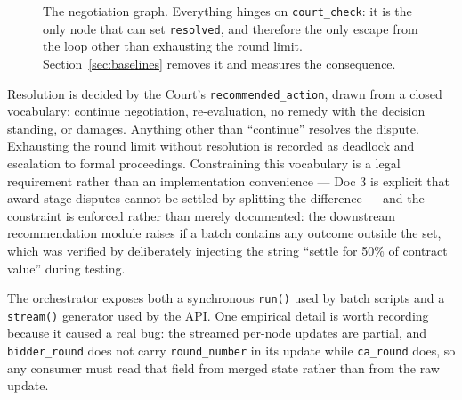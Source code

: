\begin{figure}[htbp]
\centering
{}
\caption[Negotiation state graph]{The negotiation graph. Everything hinges on
\texttt{court\_check}: it is the only node that can set \texttt{resolved}, and
therefore the only escape from the loop other than exhausting the round limit.
Section~\ref{sec:baselines} removes it and measures the consequence.}
\label{fig:graph}
\end{figure}

Resolution is decided by the Court's \texttt{recommended\_action}, drawn from a
closed vocabulary: continue negotiation, re-evaluation, no remedy with the
decision standing, or damages. Anything other than ``continue'' resolves the
dispute. Exhausting the round limit without resolution is recorded as deadlock and
escalation to formal proceedings. Constraining this vocabulary is a legal
requirement rather than an implementation convenience --- Doc 3 is explicit that
award-stage disputes cannot be settled by splitting the difference --- and the
constraint is enforced rather than merely documented: the downstream
recommendation module raises if a batch contains any outcome outside the set,
which was verified by deliberately injecting the string ``settle for 50\% of
contract value'' during testing.

The orchestrator exposes both a synchronous \texttt{run()} used by batch scripts
and a \texttt{stream()} generator used by the API. One empirical detail is worth
recording because it caused a real bug: the streamed per-node updates are partial,
and \texttt{bidder\_round} does not carry \texttt{round\_number} in its update
while \texttt{ca\_round} does, so any consumer must read that field from merged
state rather than from the raw update.

